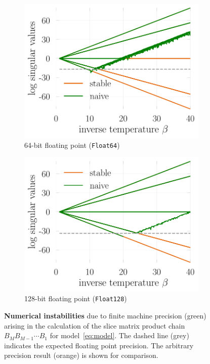 \documentclass[submission, Phys]{SciPost}
\begin{document}
\begin{figure}
	\centering
	\begin{subfigure}{0.48\textwidth}
		\includegraphics[width=\textwidth]{figures/naive_vs_stable.pdf}
		\caption{64-bit floating point (\texttt{Float64}) \label{fig:naive_vs_stable_float64}}
	\end{subfigure}%
	\hspace{10pt}
	\begin{subfigure}{0.48\textwidth}
		\includegraphics[width=\textwidth]{figures/naive_vs_stable_float128.pdf}
		\caption{128-bit floating point (\texttt{Float128}) \label{fig:naive_vs_stable_float128}}
	\end{subfigure}
	\vspace{5pt}
	\caption[MyCaption]{\textbf{Numerical instabilities} due to finite machine precision (green) arising in the calculation of the slice matrix product chain $B_M B_{M-1} \cdots B_1$ for model~\eqref{eq:model}. The dashed line (grey) indicates the expected floating point precision\protect\footnotemark. The arbitrary precision result (orange) is shown for comparison.}
	\label{fig:naive_vs_stable}
\end{figure}
\end{document}
